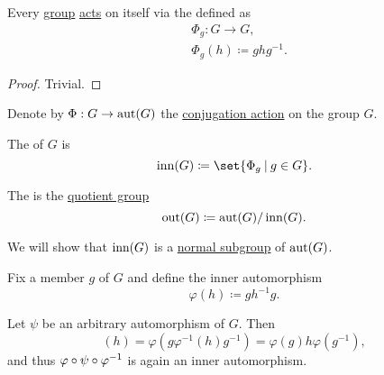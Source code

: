 \begin{proposition}\label{thm:group_conjugation_action}
  Every \hyperref[def:group]{group} \hyperref[def:group_action]{acts} on itself via the  defined as
  \begin{equation*}
    \begin{aligned}
      &\Phi_g: G \to G, \\
      &\Phi_g(h) \coloneqq g h g^{-1}.
    \end{aligned}
  \end{equation*}
\end{proposition}
\begin{proof}
  Trivial.
\end{proof}

\begin{definition}\label{def:inner_and_outer_automorphisms}
  Denote by \( \Phi: G \to \operatorname{aut}(G) \) the \hyperref[thm:group_conjugation_action]{conjugation action} on the group \( G \).

  The  of \( G \) is
  \begin{equation*}
    \op{inn}(G) \coloneqq \set{ \Phi_g \given g \in G }.
  \end{equation*}

  The  is the \hyperref[def:group/quotient]{quotient group}
  \begin{equation*}
    \operatorname{out}(G) \coloneqq \operatorname{aut}(G) / \operatorname{inn}(G).
  \end{equation*}
\end{definition}
\begin{defproof}
  We will show that \( \operatorname{inn}(G) \) is a \hyperref[thm:normal_subgroup_equivalences]{normal subgroup} of \( \operatorname{aut}(G) \).

  Fix a member \( g \) of \( G \) and define the inner automorphism
  \begin{equation*}
    \varphi(h) \coloneqq gh^{-1}g.
  \end{equation*}

  Let \( \psi \) be an arbitrary automorphism of \( G \). Then
  \begin{equation*}
    [\varphi \bincirc \psi \bincirc \varphi^{-1}](h)
    =
    \varphi(g \varphi^{-1}(h) g^{-1})
    =
    \varphi(g) h \varphi(g^{-1}),
  \end{equation*}
  and thus \( \varphi \bincirc \psi \bincirc \varphi^{-1} \) is again an inner automorphism.
\end{defproof}

